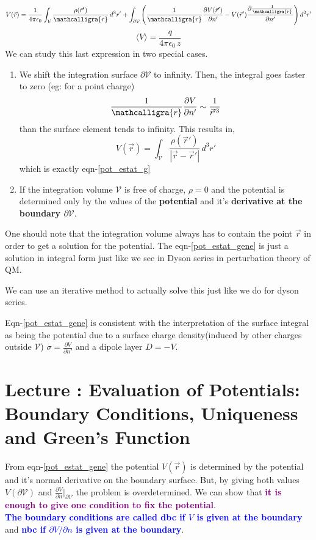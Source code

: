\documentclass{article}
\newcommand{\scriptr}{\mathord{\mathcalligra{r}}}
\newcommand{\lecture}[1]{
  \section{Lecture \thesection: #1}
}
\begin{document}
\begin{equation}
    V(\vec{r}) = \frac{1}{4\pi \epsilon_0}\int_{\mathcal{V}}\frac{\rho(\vec{r}')}{\scriptr}\, d^3 r' + \int_{\partial \mathcal{V}}\Bigg(\frac{1}{\scriptr} \frac{\partial V(\vec{r}')}{\partial n'} - V(\vec{r}') \frac{\partial\frac{1}{\scriptr}}{\partial n'}\Bigg)\, d^2 r'
    \label{pot_estat_gene}
\end{equation}
\begin{equation}
    \langle V\rangle = \frac{q}{4\pi \epsilon_0 \, z}
\end{equation} 
We can study this last expression in two special cases.
\begin{enumerate}
    \item We shift the integration surface $\partial\mathcal{V}$ to infinity. Then, the integral goes faster to zero (eg: for a point charge)
    \begin{equation*}
        \frac{1}{\scriptr}\frac{\partial V}{\partial n'}\sim \frac{1}{\vec{r}'^3}
    \end{equation*}
    than the surface element tends to infinity. This results in,
    \begin{equation*}
        V(\vec{r}) = \int_{\mathcal{V}} \frac{\rho(\vec{r}')}{|\vec{r}-\vec{r}'|}\, d^3r'
    \end{equation*}
    which is exactly eqn-\ref{pot_estat_g}
    \item If the integration volume $\mathcal{V}$ is free of charge, $\rho = 0$ and the potential is determined only by the values of the \textbf{potential} and it's \textbf{derivative at the boundary $\partial\mathcal{V}$}. 
\end{enumerate}
One should note that the integration volume always has to contain the point $\vec{r}$ in order to get a solution for the potential. The eqn-\ref{pot_estat_gene} is just a solution in integral form just like we see in Dyson series in perturbation theory of QM.

We can use an iterative method to actually solve this just like we do for dyson series.
\begin{note}
    Eqn-\ref{pot_estat_gene} is consistent with the interpretation of the surface integral as being the potential due to a surface charge density(induced by other charges outside $\mathcal{V}$) $\sigma = \frac{\partial V}{\partial n'}$ and a dipole layer $D=-V$.
\end{note}
\lecture{Evaluation of Potentials: Boundary Conditions, Uniqueness and Green's Function}
From eqn-\ref{pot_estat_gene} the potential $V(\vec{r})$ is determined by the potential and it's normal derivative on the boundary surface. But, by giving both values $V(\partial \mathcal{V})$ and $\frac{\partial V}{\partial n}|_{\partial \mathcal{V}}$ the problem is overdetermined. We can show that \textcolor{purple}{\textbf{it is enough to give one condition to fix the potential}}.\\
\textcolor{blue}{\textbf{The boundary conditions are called \gls{dbc} if $V$ is given at the boundary}} and \textcolor{blue}{\textbf{\gls{nbc} if $\partial V/\partial n$ is given at the boundary}}.
\end{document}
